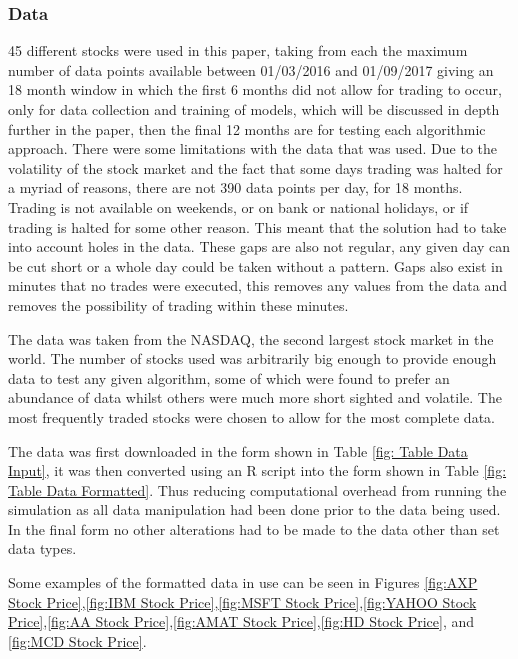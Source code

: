 \documentclass[conference]{IEEEtran}
\begin{document}
\subsubsection{Data}

45 different stocks were used in this paper, taking from each the maximum number of data points available between 01/03/2016 and 01/09/2017 giving an 18 month window in which the first 6 months did not allow for trading to occur, only for data collection and training of models, which will be discussed in depth further in the paper, then the final 12 months are for testing each algorithmic approach. There were some limitations with the data that was used. Due to the volatility of the stock market and the fact that some days trading was halted for a myriad of reasons, there are not 390 data points per day, for 18 months. Trading is not available on weekends, or on bank or national holidays, or if trading is halted for some other reason. This meant that the solution had to take into account holes in the data. These gaps are also not regular, any given day can be cut short or a whole day could be taken without a pattern. Gaps also exist in minutes that no trades were executed, this removes any values from the data and removes the possibility of trading within these minutes.

The data was taken from the NASDAQ, the second largest stock market in the world. The number of stocks used was arbitrarily big enough to provide enough data to test any given algorithm, some of which were found to prefer an abundance of data whilst others were much more short sighted and volatile. The most frequently traded stocks were chosen to allow for the most complete data.

The data was first downloaded in the form shown in Table \ref{fig: Table Data Input}, it was then converted using an R script into the form shown in Table \ref{fig: Table Data Formatted}. Thus reducing computational overhead from running the simulation as all data manipulation had been done prior to the data being used. In the final form no other alterations had to be made to the data other than set data types. 

Some examples of the formatted data in use can be seen in Figures  \ref{fig:AXP Stock Price},\ref{fig:IBM Stock Price},\ref{fig:MSFT Stock Price},\ref{fig:YAHOO Stock Price},\ref{fig:AA Stock Price},\ref{fig:AMAT Stock Price},\ref{fig:HD Stock Price}, and \ref{fig:MCD Stock Price}.
\end{document}
